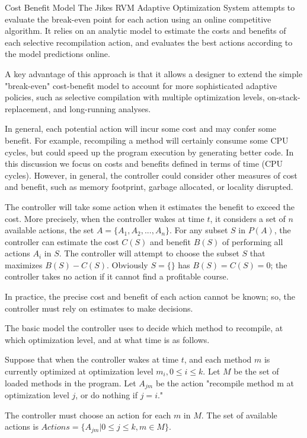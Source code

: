 \begin{section}{Cost Benefit Model}
The Jikes RVM Adaptive Optimization System attempts to evaluate the break-even point for each action using an online competitive algorithm.  It relies on an analytic model to estimate the costs and benefits of each selective recompilation action, and evaluates the best actions according to the model predictions online.

A key advantage of this approach is that it allows a designer to extend the simple "break-even" cost-benefit model to account for more sophisticated adaptive policies, such as selective compilation with multiple optimization levels, on-stack-replacement, and long-running analyses.

In general, each potential action will incur some cost and may confer some benefit. For example, recompiling a method will certainly consume some CPU cycles, but could speed up the program execution by generating better code. In this discussion we focus on costs and benefits defined in terms of time (CPU cycles). However, in general, the controller could consider other measures of cost and benefit, such as memory footprint, garbage allocated, or locality disrupted.

The controller will take some action when it estimates the benefit to exceed the cost. More precisely, when the controller wakes at time $t$, it considers a set of $n$ available actions, the set $A = \{A_1, A_2, ..., A_n\}$. For any subset $S$ in $P(A)$, the controller can estimate the cost $C(S)$ and benefit $B(S)$ of performing all actions $A_i$ in $S$. The controller will attempt to choose the subset $S$ that maximizes $B(S) - C(S)$. Obviously $S = \{\}$ has $B(S) = C(S) = 0$; the controller takes no action if it cannot find a profitable course.

In practice, the precise cost and benefit of each action cannot be known; so, the controller must rely on estimates to make decisions.

The basic model the controller uses to decide which method to recompile, at which optimization level, and at what time is as follows.

Suppose that when the controller wakes at time $t$, and each method $m$ is currently optimized at optimization level $m_i, 0 \leq i \leq k$. Let $M$ be the set of loaded methods in the program. Let $A_{jm}$ be the action "recompile method m at optimization level $j$, or do nothing if $j = i$."

The controller must choose an action for each $m$ in $M$. The set of available actions is $Actions = \{A_{jm} | 0 \leq j \leq k, m \in M\}$.


\end{section}
